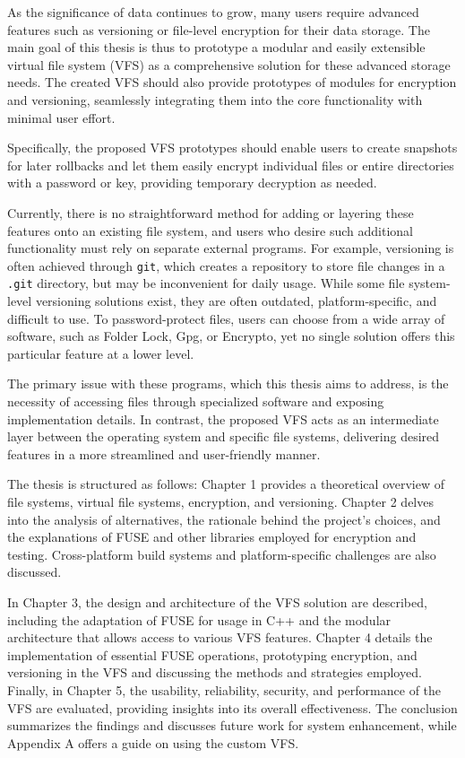 
As the significance of data continues to grow, many users require advanced features such as versioning or file-level encryption for their data storage.
The main goal of this thesis is thus to prototype a modular and easily extensible virtual file system (VFS) as a comprehensive solution for these advanced storage needs.
The created VFS should also provide prototypes of modules for encryption and versioning, seamlessly integrating them into the core functionality with minimal user effort.

Specifically, the proposed VFS prototypes should enable users to create snapshots for later rollbacks and let them easily encrypt individual files or entire directories with a password or key, providing temporary decryption as needed.

Currently, there is no straightforward method for adding or layering these features onto an existing file system, and users who desire such additional functionality must rely on separate external programs.
For example, versioning is often achieved through \texttt{git}, which creates a repository to store file changes in a \texttt{.git} directory, but may be inconvenient for daily usage.
While some file system-level versioning solutions exist, they are often outdated, platform-specific, and difficult to use.
To password-protect files, users can choose from a wide array of software, such as Folder Lock, Gpg, or Encrypto, yet no single solution offers this particular feature at a lower level.

The primary issue with these programs, which this thesis aims to address, is the necessity of accessing files through specialized software and exposing implementation details.
In contrast, the proposed VFS acts as an intermediate layer between the operating system and specific file systems, delivering desired features in a more streamlined and user-friendly manner.

The thesis is structured as follows: Chapter 1 provides a theoretical overview of file systems, virtual file systems, encryption, and versioning.
Chapter 2 delves into the analysis of alternatives, the rationale behind the project's choices, and the explanations of FUSE and other libraries employed for encryption and testing.
Cross-platform build systems and platform-specific challenges are also discussed.

 In Chapter 3, the design and architecture of the VFS solution are described, including the adaptation of FUSE for usage in C++ and the modular architecture that allows access to various VFS features.
Chapter 4 details the implementation of essential FUSE operations, prototyping encryption, and versioning in the VFS and discussing the methods and strategies employed. 
Finally, in Chapter 5, the usability, reliability, security, and performance of the VFS are evaluated, providing insights into its overall effectiveness.
The conclusion summarizes the findings and discusses future work for system enhancement, while Appendix A offers a guide on using the custom VFS.